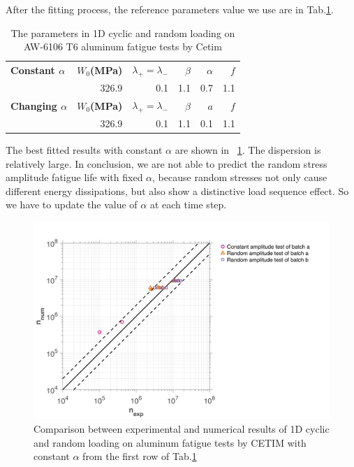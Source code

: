 \documentclass[3p,times,procedia,number]{elsarticle}
\newcommand{\figref}[1]{\figurename~\ref{#1}}
\begin{document}
After the fitting process, the reference parameters value we use are in Tab.\ref{tab.cetim.alp}.
\begin{table}[!h]
	\centering
	\begin{tabular}{lrrrrr}
		\hline
		\textbf{Constant $\alpha$} & \textbf{$W_0$(MPa)} & \textbf{$\lambda_+=\lambda_-$} & \textbf{$\beta$}  & \textbf{$\alpha$}& \textbf{$f$}\\
		& 326.9         & 0.1               & 1.1            & 0.7      & 1.1                    \\ \hline
		\textbf{Changing $\alpha$} & \textbf{$W_0$(MPa)} & \textbf{$\lambda_+=\lambda_-$} & \textbf{$\beta$}  & \textbf{$a$} & \textbf{$f$}\\
		& 326.9         & 0.1               & 1.1            & 0.1         & 1.1                \\ \hline
	\end{tabular}
	\caption{The parameters in 1D cyclic and random loading on AW-6106 T6
		aluminum fatigue tests by Cetim}
	\label{tab.cetim.alp}
\end{table}

The best fitted results with constant $\alpha$ are shown in \figref{fig.Cetimerralpfix}. The dispersion is relatively large. In conclusion, we are not able to predict the random stress amplitude fatigue life with fixed $\alpha$, because random stresses not only cause different energy dissipations, but also show a distinctive load sequence effect. So we have to update the value of $\alpha$ at each time step. 

\begin{figure}[!h]
	\centering
	\includegraphics[width=\textwidth]{figures//Cetim_err_alpfix.png} 
	\caption{Comparison between experimental and numerical results of 1D cyclic and random loading on aluminum fatigue tests by CETIM with constant $\alpha$ from the first row of Tab.\ref{tab.cetim.alp}}
	\label{fig.Cetimerralpfix}
\end{figure}
\end{document}
